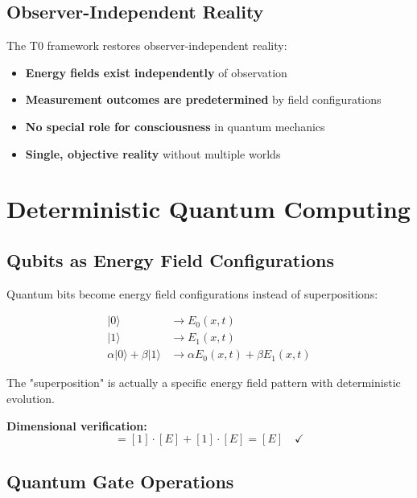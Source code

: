 \documentclass[12pt,a4paper]{report}
\begin{document}
\subsection{Observer-Independent Reality}
\label{subsec:observer_independent}

The T0 framework restores observer-independent reality:

\begin{itemize}
	\item \textbf{Energy fields exist independently} of observation
	\item \textbf{Measurement outcomes are predetermined} by field configurations
	\item \textbf{No special role for consciousness} in quantum mechanics
	\item \textbf{Single, objective reality} without multiple worlds
\end{itemize}

\section{Deterministic Quantum Computing}
\label{sec:deterministic_quantum_computing}

\subsection{Qubits as Energy Field Configurations}
\label{subsec:qubits_energy_fields}

Quantum bits become energy field configurations instead of superpositions:

\begin{align}
	|0\rangle &\rightarrow E_0(x,t) \\
	|1\rangle &\rightarrow E_1(x,t) \\
	\alpha|0\rangle + \beta|1\rangle &\rightarrow \alpha E_0(x,t) + \beta E_1(x,t)
\end{align}

The "superposition" is actually a specific energy field pattern with deterministic evolution.

\textbf{Dimensional verification:}
\begin{equation}
	[\alpha E_0 + \beta E_1] = [1] \cdot [E] + [1] \cdot [E] = [E] \quad \checkmark
\end{equation}

\subsection{Quantum Gate Operations}
\label{subsec:quantum_gate_operations}
\end{document}
